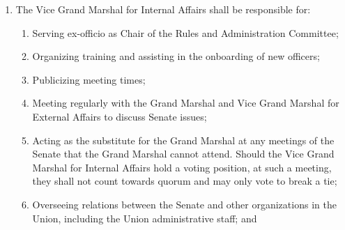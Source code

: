 \documentclass{uniondoc}
\begin{document}
\begin{enumerate}
	      \begin{enumerate}
		      \item Overseeing the Senate’s role in campus advocacy, becoming familiar with the advocacy work of all Senate committees, and serving as an assistant to committee chairs and members on advocacy work;
		      \item Meeting regularly with the Grand Marshal and Vice Grand Marshal for Internal Affairs to discuss Senate issues;
		      \item Serving, as may be necessary, as a liaison to members of the Institute administration to set up meetings and coordinate joint advocacy projects between committees;
		      \item Serving as a substitute for the Grand Marshal at meetings with Institute administrators as may be requested by the Grand Marshal;
		      \item Providing guidance and assistance in special operations to raise awareness of issues of importance to students, in collaboration with relevant bodies of the Senate;
		      \item Assisting individual Senators that have been charged with investigating issues raised by petition; and
		      \item Creating and maintaining documentation to strengthen committee advocacy work.
	      \end{enumerate}
	\item The Vice Grand Marshal for Internal Affairs shall be responsible for:
	      \begin{enumerate}
		      \item Serving ex-officio as Chair of the Rules and Administration Committee;
		      \item Organizing training and assisting in the onboarding of new officers;
		      \item Publicizing meeting times;
		      \item Meeting regularly with the Grand Marshal and Vice Grand Marshal for External Affairs to discuss Senate issues;
		      \item Acting as the substitute for the Grand Marshal at any meetings of the Senate that the Grand Marshal cannot attend.
		            Should the Vice Grand Marshal for Internal Affairs hold a voting position, at such a meeting, they shall not count towards quorum and may only vote to break a tie;
		      \item Overseeing relations between the Senate and other organizations in the Union, including the Union administrative staff; and

\end{enumerate}
\end{enumerate}
\end{document}
